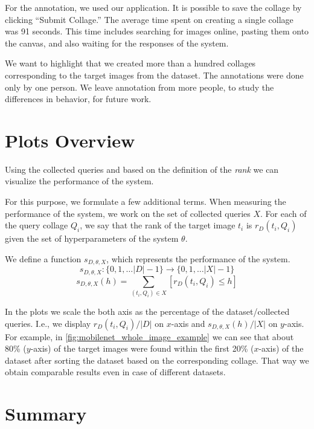 For the annotation, we used our application. It is possible to save the collage by clicking ``Submit Collage.'' The average time spent on creating a single collage was 91 seconds. This time includes searching for images online, pasting them onto the canvas, and also waiting for the responses of the system.

We want to highlight that we created more than a hundred collages corresponding to the target images from the dataset. The annotations were done only by one person. We leave annotation from more people, to study the differences in behavior, for future work. 

\section{Plots Overview}

Using the collected queries and based on the definition of the \emph{rank} we can visualize the performance of the system.

For this purpose, we formulate a few additional terms. When measuring the performance of the system, we work on the set of collected queries $X$. For each of the query collage $Q_i$, we say that the rank of the target image $t_i$ is $r_D(t_i, Q_i)$ given the set of hyperparameters of the system $\theta$.

We define a function $s_{D, \theta, X}$, which represents the performance of the system.
$$
s_{D, \theta, X}:\{0, 1, \ldots |D| - 1\} \rightarrow \{0, 1, \ldots |X| - 1\}
$$  
$$
s_{D, \theta, X}(h) = \sum_{(t_i, Q_i) \in X}[r_D(t_i, Q_i) \leq h]
$$

In the plots we scale the both axis as the percentage of the dataset/collected queries. I.e., we display $r_D(t_i, Q_i) / |D|$ on $x$-axis and $s_{D, \theta, X}(h) / |X|$ on $y$-axis. For example, in \autoref{fig:mobilenet_whole_image_example} we can see that about 80\% ($y$-axis) of the target images were found within the first 20\% ($x$-axis) of the dataset after sorting the dataset based on the corresponding collage.
That way we obtain comparable results even in case of different datasets. 


\section{Summary}

